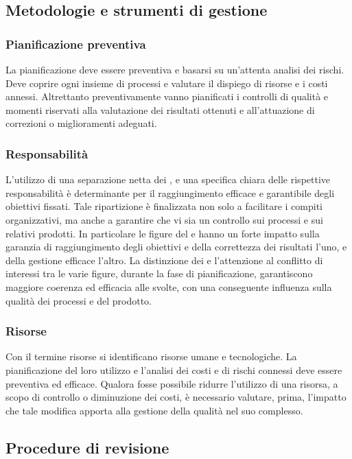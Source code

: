 \documentclass[12pt,a4paper]{article}
\begin{document}
\subsection{Metodologie e strumenti di gestione}

\subsubsection{Pianificazione preventiva}
La pianificazione deve essere preventiva e basarsi su un'attenta analisi dei rischi. Deve coprire ogni insieme di processi e valutare il dispiego di risorse e i costi annessi. Altrettanto preventivamente vanno pianificati i controlli di qualità e momenti riservati alla valutazione dei risultati ottenuti e all'attuazione di correzioni o miglioramenti adeguati.

\subsubsection{Responsabilità}
L'utilizzo di una separazione netta dei , e una specifica chiara delle rispettive responsabilità è determinante per il raggiungimento efficace e garantibile degli obiettivi fissati. Tale ripartizione è finalizzata non solo a facilitare i compiti organizzativi, ma anche a garantire che vi sia un controllo sui processi e sui relativi prodotti. In particolare le figure del \VR e \RE hanno un forte impatto sulla garanzia di raggiungimento degli obiettivi e della correttezza dei risultati l'uno, e della gestione efficace l'altro. La distinzione dei  e l'attenzione al conflitto di interessi tra le varie figure, durante la fase di pianificazione, garantiscono maggiore coerenza ed efficacia alle  svolte, con una conseguente influenza sulla qualità dei processi e del prodotto.

\subsubsection{Risorse}\label{risorse}
Con il termine risorse si identificano risorse umane e tecnologiche. La pianificazione del loro utilizzo e l'analisi dei costi e di rischi connessi deve essere preventiva ed efficace. Qualora fosse possibile ridurre l'utilizzo di una risorsa, a scopo di controllo o diminuzione dei costi, è necessario valutare, prima, l'impatto che tale modifica apporta alla gestione della qualità nel suo complesso.

\subsection{Procedure di revisione}
\end{document}
